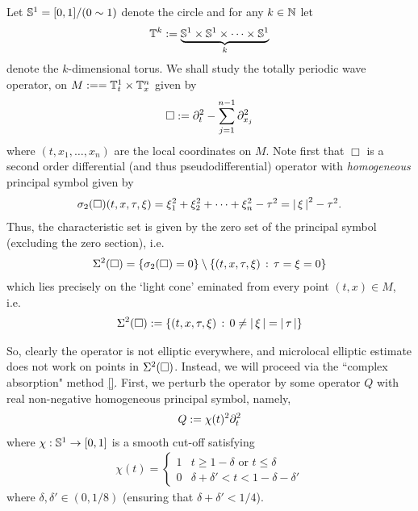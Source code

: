 \documentclass[12pt]{article}
\begin{document}
Let $\S^1 = [0,1] / (0 \sim 1)$ denote the circle and for any $k \in \N$ let
\begin{align*}
\T^k := \underbrace{\S^1 \times \S^1 \times \dots \times \S^1}_{k}
\end{align*}
denote the $k$-dimensional torus. We shall study the totally periodic wave operator, on $M :=  = \T_t^1 \times \T_x^{n}$ given by
\begin{align}\label{eq: d'Alembertian}
    \Box := \p_t^2 - \sum_{j = 1}^{n -1} \p_{x_j}^2
\end{align}
where $(t, x_1, \dots, x_n)$ are the local coordinates on $M$. Note first that $\Box$ is a second order differential (and thus pseudodifferential) operator with \textit{homogeneous} principal symbol given by 
\begin{align*}
    \sigma_2(\Box)(t, x, \tau, \xi) = \xi_1^2 + \xi_2^2 + \dots + \xi_{n}^2 - \tau^2 = \abs{\xi}^2 - \tau^2. 
\end{align*}
Thus, the characteristic set is given by the zero set of the principal symbol (excluding the zero section), i.e. 
\begin{align*}
\Char^2(\Box) = \set{\sigma_2(\Box) = 0} \setminus \set{(t, x, \tau, \xi) \wh \tau = \xi = 0}
\end{align*}
which lies precisely on the `light cone' eminated from every point $(t, x) \in M$, i.e.  
\begin{align*}
\Char^2(\Box) := \set{(t, x, \tau, \xi) \wh 0 \neq \abs{\xi}  = \abs{\tau}} 
\end{align*} 

So, clearly the operator is not elliptic everywhere, and microlocal elliptic estimate does not work on points in $\Char^2(\Box)$.  Instead, we will proceed via the ``complex absorption" method \ref{}. First, we perturb the operator by some operator $Q$ with real non-negative homogeneous principal symbol, namely, 
\begin{align*}
Q := \chi(t)^2 \p_t^2
\end{align*}
where $\chi : \S^1 \to [0, 1]$ is a smooth cut-off satisfying
\begin{align*}
\chi(t) = 
\begin{cases}
1 & t \geq  1 - \delta \text{ or } t \leq \delta \\
0 &  \delta + \delta' < t < 1 - \delta - \delta'
\end{cases}
\end{align*}
where $\delta, \delta' \in (0, 1/8)$ (ensuring that $\delta+ \delta' < 1/4$). 
\end{document}
